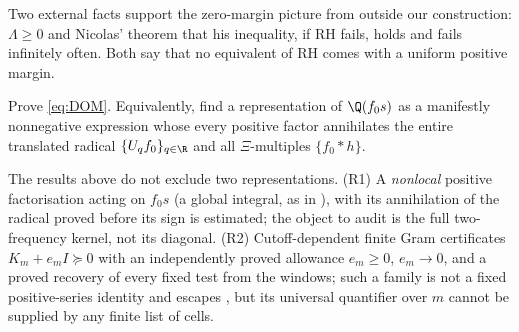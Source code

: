 Two external facts support the zero-margin picture from outside our construction: $\Lambda\ge0$ and Nicolas' theorem that
his inequality, if RH fails, holds and fails infinitely often. Both say that no equivalent of RH comes with a uniform positive margin.

\begin{problem}\label{prob:DOM}
Prove \eqref{eq:DOM}. Equivalently, find a representation of $\Q(f_0s)$ as a manifestly nonnegative expression whose every positive
factor annihilates the entire translated radical $\{U_qf_0\}_{q\in\R}$ and all $\Xi$-multiples $\{f_0*h\}$.
\end{problem}

The results above do not exclude two representations. (R1) A \emph{nonlocal} positive factorisation acting on $f_0s$ (a global
integral, as in ), with its annihilation of the radical proved before its sign is estimated; the object to audit is
the full two-frequency kernel, not its diagonal. (R2) Cutoff-dependent finite Gram certificates $K_m+e_mI\succeq0$ with an
independently proved allowance $e_m\ge0$, $e_m\to0$, and a proved recovery of every fixed test from the windows; such a family is
not a fixed positive-series identity and escapes , but its universal quantifier over $m$ cannot be supplied by
any finite list of cells.

